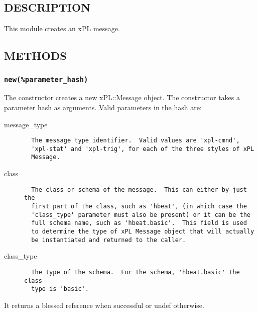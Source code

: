 \documentclass[12pt,a4paper]{article}
\begin{document}
\subsection*{DESCRIPTION\label{xPL::Message_DESCRIPTION}}


This module creates an xPL message.

\subsection*{METHODS\label{xPL::Message_METHODS}}
\subsubsection*{\texttt{new(\%parameter\_hash)}\label{xPL::Message_new_parameter_hash_}}


The constructor creates a new xPL::Message object.  The constructor
takes a parameter hash as arguments.  Valid parameters in the hash
are:

\begin{description}

\item[{message\_type}] \mbox{}\begin{verbatim}
  The message type identifier.  Valid values are 'xpl-cmnd',
  'xpl-stat' and 'xpl-trig', for each of the three styles of xPL
  Message.
\end{verbatim}

\item[{class}] \mbox{}\begin{verbatim}
  The class or schema of the message.  This can either by just the
  first part of the class, such as 'hbeat', (in which case the
  'class_type' parameter must also be present) or it can be the
  full schema name, such as 'hbeat.basic'.  This field is used
  to determine the type of xPL Message object that will actually
  be instantiated and returned to the caller.
\end{verbatim}

\item[{class\_type}] \mbox{}\begin{verbatim}
  The type of the schema.  For the schema, 'hbeat.basic' the class
  type is 'basic'.
\end{verbatim}
\end{description}


It returns a blessed reference when successful or undef otherwise.
\end{document}
